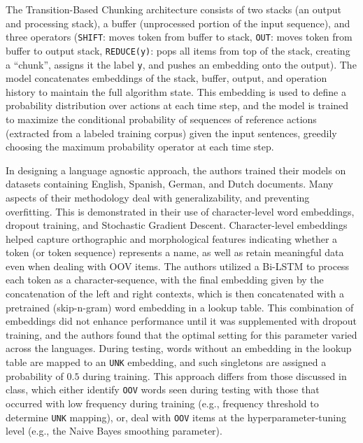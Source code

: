 \documentclass[11pt]{article}
\begin{document}

The Transition-Based Chunking architecture
consists of two stacks (an output 
and processing stack), 
a buffer (unprocessed
portion of the input sequence), and three
operators (\texttt{SHIFT}: moves token from
buffer to stack, \texttt{OUT}: moves token from buffer 
to output stack, \texttt{REDUCE(y)}: pops all items from
top of the stack, creating a “chunk”, assigns it the label \texttt{y}, 
and pushes an embedding onto the output). 
The model concatenates embeddings of 
the stack, buffer, output, 
and operation history to maintain
the full algorithm state.
This embedding is used to define a 
probability distribution over actions 
at each time step, and the model is trained 
to maximize the conditional probability of
sequences of reference actions 
(extracted from a labeled training corpus) 
given the input sentences, greedily choosing
the maximum probability operator at each time step. 



In designing a language agnostic approach,
the authors trained their models on datasets 
containing English, Spanish, 
German, and Dutch documents. Many aspects
of their methodology deal with generalizability, 
and preventing overfitting. This is demonstrated 
in their use of character-level word embeddings, 
dropout training,
and Stochastic Gradient Descent.
Character-level embeddings helped capture 
orthographic and morphological features 
indicating whether a token (or token sequence) 
represents a name, as well as retain 
meaningful data even when dealing with OOV items.
The authors utilized a Bi-LSTM
to process each token as a character-sequence,
with the final embedding given by the concatenation 
of the left and right contexts, which is then 
concatenated with a pretrained (skip-n-gram) 
word embedding in a lookup table.
This combination of embeddings did not enhance 
performance until it was supplemented with dropout 
training, and the authors found that the optimal
setting for this parameter varied across the languages.
During testing, 
words without an embedding in the
lookup table are mapped to an \texttt{UNK}
embedding, and such singletons
are assigned a probability of $0.5$ during training.
This approach differs from those discussed in
class, which either identify \texttt{OOV} words seen
during testing with those that occurred
with low frequency during training (e.g., frequency threshold
to determine \texttt{UNK} mapping), 
or, deal with \texttt{OOV} items at the hyperparameter-tuning level 
(e.g., the Naive Bayes smoothing parameter).
\end{document}
